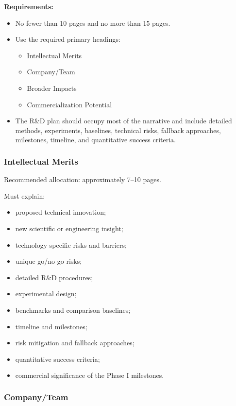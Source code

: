 \documentclass[11pt,letterpaper]{article}
\begin{document}
\textbf{Requirements:}

\begin{itemize}[leftmargin=0.25in]
    \item No fewer than 10 pages and no more than 15 pages.
    \item Use the required primary headings:
    \begin{itemize}
        \item Intellectual Merits
        \item Company/Team
        \item Broader Impacts
        \item Commercialization Potential
    \end{itemize}
    \item The R\&D plan should occupy most of the narrative and include
    detailed methods, experiments, baselines, technical risks, fallback
    approaches, milestones, timeline, and quantitative success criteria.
\end{itemize}

\subsubsection*{Intellectual Merits}

Recommended allocation: approximately 7--10 pages.

Must explain:

\begin{itemize}[leftmargin=0.25in]
    \item proposed technical innovation;
    \item new scientific or engineering insight;
    \item technology-specific risks and barriers;
    \item unique go/no-go risks;
    \item detailed R\&D procedures;
    \item experimental design;
    \item benchmarks and comparison baselines;
    \item timeline and milestones;
    \item risk mitigation and fallback approaches;
    \item quantitative success criteria;
    \item commercial significance of the Phase I milestones.
\end{itemize}

\subsubsection*{Company/Team}
\end{document}
